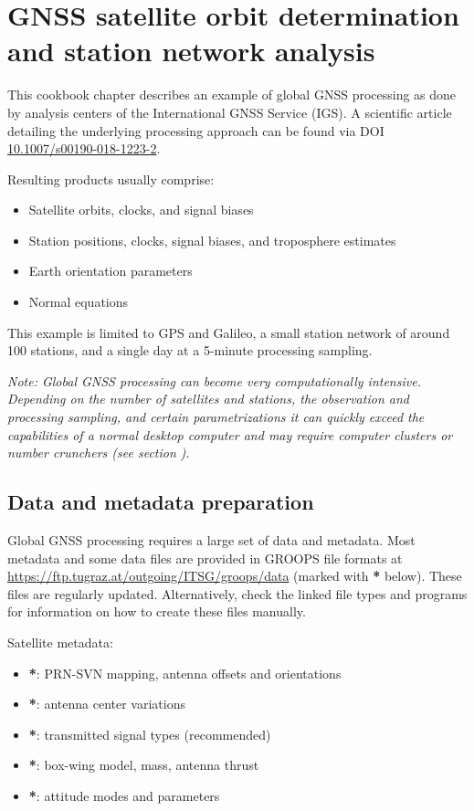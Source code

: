 \section{GNSS satellite orbit determination and station network analysis}\label{cookbook.gnssNetwork}

This cookbook chapter describes an example of global GNSS processing as done by analysis centers of the
International GNSS Service (IGS). A scientific article detailing the underlying processing approach
can be found via DOI \href{https://doi.org/10.1007/s00190-018-1223-2}{10.1007/s00190-018-1223-2}.

Resulting products usually comprise:
\begin{itemize}
  \item Satellite orbits, clocks, and signal biases
  \item Station positions, clocks, signal biases, and troposphere estimates
  \item Earth orientation parameters
  \item Normal equations
\end{itemize}

This example is limited to GPS and Galileo, a small station network of around 100 stations, and a single day at a 5-minute
processing sampling.

\emph{Note: Global GNSS processing can become very computationally intensive. Depending on the number of satellites
and stations, the observation and processing sampling, and certain parametrizations it can quickly exceed the capabilities
of a normal desktop computer and may require computer clusters or number crunchers (see section}
\emph{).}

\subsection{Data and metadata preparation}

Global GNSS processing requires a large set of data and metadata. Most metadata and some data files are
provided in GROOPS file formats at \url{https://ftp.tugraz.at/outgoing/ITSG/groops/data}
(marked with \textbf{*} below). These files are regularly updated. Alternatively, check the linked
file types and programs for information on how to create these files manually.

Satellite metadata:
\begin{itemize}
  \item {}\textbf{*}: PRN-SVN mapping, antenna offsets and orientations
  \item {}\textbf{*}: antenna center variations
  \item {}\textbf{*}: transmitted signal types (recommended)
  \item {}\textbf{*}: box-wing model, mass, antenna thrust
  \item {}\textbf{*}: attitude modes and parameters
\end{itemize}

